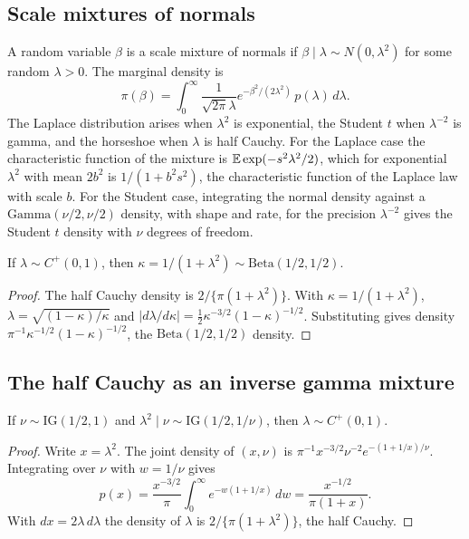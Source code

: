 \subsection{Scale mixtures of normals}

A random variable $\beta$ is a scale mixture of normals if $\beta \mid \lambda \sim N(0, \lambda^2)$ for some random $\lambda > 0$. The marginal density is
\[
\pi(\beta) = \int_0^\infty \frac{1}{\sqrt{2\pi}\lambda}e^{-\beta^2/(2\lambda^2)}\,p(\lambda)\,d\lambda.
\]
The Laplace distribution arises when $\lambda^2$ is exponential, the Student $t$ when $\lambda^{-2}$ is gamma, and the horseshoe when $\lambda$ is half Cauchy. For the Laplace case the characteristic function of the mixture is $\mathbb{E}\exp(-s^2\lambda^2/2)$, which for exponential $\lambda^2$ with mean $2b^2$ is $1/(1 + b^2s^2)$, the characteristic function of the Laplace law with scale $b$. For the Student case, integrating the normal density against a $\mathrm{Gamma}(\nu/2, \nu/2)$ density, with shape and rate, for the precision $\lambda^{-2}$ gives the Student $t$ density with $\nu$ degrees of freedom.

\begin{proposition}
If $\lambda \sim C^+(0,1)$, then $\kappa = 1/(1 + \lambda^2) \sim \mathrm{Beta}(1/2, 1/2)$.
\end{proposition}

\begin{proof}
The half Cauchy density is $2/\{\pi(1 + \lambda^2)\}$. With $\kappa = 1/(1 + \lambda^2)$, $\lambda = \sqrt{(1-\kappa)/\kappa}$ and $|d\lambda/d\kappa| = \frac{1}{2}\kappa^{-3/2}(1-\kappa)^{-1/2}$. Substituting gives density $\pi^{-1}\kappa^{-1/2}(1-\kappa)^{-1/2}$, the $\mathrm{Beta}(1/2, 1/2)$ density.
\end{proof}

\subsection{The half Cauchy as an inverse gamma mixture}

\begin{proposition}
If $\nu \sim \mathrm{IG}(1/2, 1)$ and $\lambda^2 \mid \nu \sim \mathrm{IG}(1/2, 1/\nu)$, then $\lambda \sim C^+(0, 1)$.
\end{proposition}

\begin{proof}
Write $x = \lambda^2$. The joint density of $(x, \nu)$ is $\pi^{-1}x^{-3/2}\nu^{-2}e^{-(1 + 1/x)/\nu}$. Integrating over $\nu$ with $w = 1/\nu$ gives
\[
p(x) = \frac{x^{-3/2}}{\pi}\int_0^\infty e^{-w(1 + 1/x)}\,dw = \frac{x^{-1/2}}{\pi(1 + x)}.
\]
With $dx = 2\lambda\,d\lambda$ the density of $\lambda$ is $2/\{\pi(1 + \lambda^2)\}$, the half Cauchy.
\end{proof}



